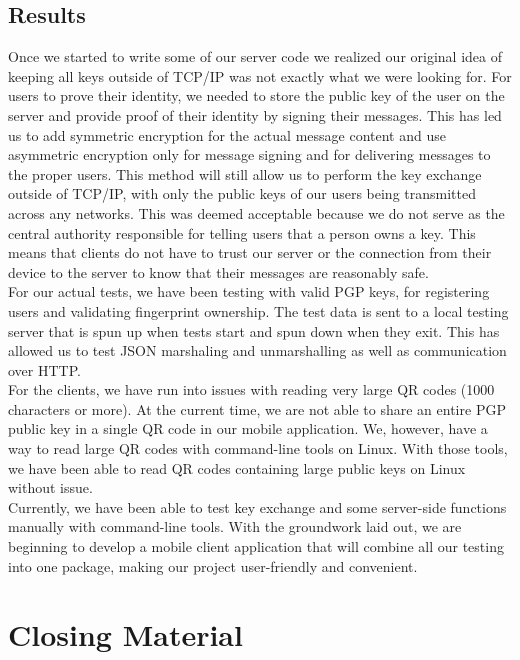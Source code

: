 \documentclass[11pt]{article}
\begin{document}
\subsection{Results}
Once we started to write some of our server code we realized our original idea of keeping all keys outside of TCP/IP was not exactly what we were looking for. For users to prove their identity, we needed to store the public key of the user on the server and provide proof of their identity by signing their messages. This has led us to add symmetric encryption for the actual message content and use asymmetric encryption only for message signing and for delivering messages to the proper users. This method will still allow us to perform the key exchange outside of TCP/IP, with only the public keys of our users being transmitted across any networks. This was deemed acceptable because we do not serve as the central authority responsible for telling users that a person owns a key. This means that clients do not have to trust our server or the connection from their device to the server to know that their messages are reasonably safe.\\

For our actual tests, we have been testing with valid PGP keys, for registering users and validating fingerprint ownership. The test data is sent to a local testing server that is spun up when tests start and spun down when they exit. This has allowed us to test JSON marshaling and unmarshalling as well as communication over HTTP.\\

For the clients, we have run into issues with reading very large QR codes (1000 characters or more). At the current time, we are not able to share an entire PGP public key in a single QR code in our mobile application. We, however, have a way to read large QR codes with command-line tools on Linux. With those tools, we have been able to read QR codes containing large public keys on Linux without issue. \\

Currently, we have been able to test key exchange and some server-side functions manually with command-line tools. With the groundwork laid out, we are beginning to develop a mobile client application that will combine all our testing into one package, making our project user-friendly and convenient.

\newpage
\section{Closing Material}
\end{document}
